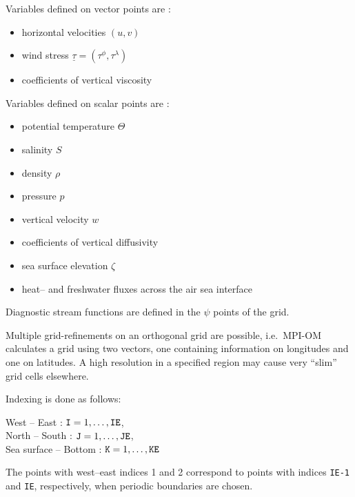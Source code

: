 \begin{figure}[!!!h]
\centerline{\hbox{}}
\label{fig:numeric:grid:horizontal}
\end{figure}


Variables defined on vector points are :
\begin{itemize}
\item{horizontal velocities $(u,v)$} 
\item{wind stress $\underline\tau=(\tau^\phi ,\tau^\lambda)$}  
\item{coefficients of vertical viscosity} 
\end{itemize}
Variables defined on scalar points are :
\begin{itemize}
\item{potential temperature $\Theta$} 
\item{salinity $S$} 
\item{density $\rho$} 
\item{pressure $p$} 
\item{vertical velocity $w$}  
\item{coefficients of vertical diffusivity} 
\item{sea surface elevation $\zeta$} 
\item{heat-- and freshwater fluxes across the air sea interface} 
\end{itemize}
Diagnostic stream functions are defined in the $\psi$ points of the grid.

Multiple grid-refinements on an orthogonal grid are possible, i.e.\ MPI-OM calculates a grid using
two vectors, one containing information on longitudes
and one on latitudes. A high resolution in a specified region may cause very ``slim'' grid cells
elsewhere. 

Indexing is done as follows:

West -- East : $\mbox{\tt I} = 1,\ldots,\mbox{\tt IE}$,\\
North -- South : $\mbox{\tt J} = 1,\ldots,\mbox{\tt JE}$,\\
Sea surface -- Bottom : $\mbox{\tt K} = 1,\ldots,\mbox{\tt KE}$

The points with west--east indices 1 and 2
correspond to points with indices {\tt IE-1} and {\tt IE}, respectively,
when periodic boundaries are chosen.


